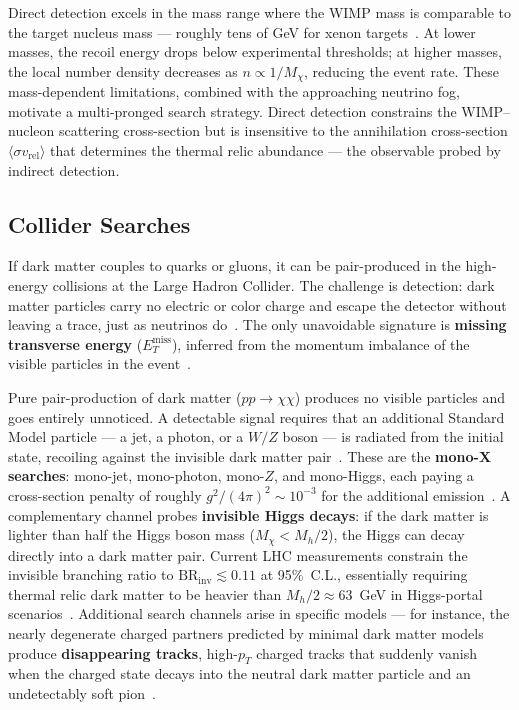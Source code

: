 Direct detection excels in the mass range where the WIMP mass is comparable to the target nucleus mass --- roughly tens of GeV for xenon targets~\cite{Cirelli:2024ssz}.
At lower masses, the recoil energy drops below experimental thresholds; at higher masses, the local number density decreases as $n \propto 1/M_\chi$, reducing the event rate.
These mass-dependent limitations, combined with the approaching neutrino fog, motivate a multi-pronged search strategy.
Direct detection constrains the WIMP--nucleon scattering cross-section but is insensitive to the annihilation cross-section $\langle \sigma v_\mathrm{rel} \rangle$ that determines the thermal relic abundance --- the observable probed by indirect detection.

\subsection{Collider Searches}
\label{sec:1.3.2}

If dark matter couples to quarks or gluons, it can be pair-produced in the high-energy collisions at the Large Hadron Collider.
The challenge is detection: dark matter particles carry no electric or color charge and escape the detector without leaving a trace, just as neutrinos do~\cite{Cirelli:2024ssz,Hooper:2024}.
The only unavoidable signature is \textbf{missing transverse energy} ($E_T^\text{miss}$), inferred from the momentum imbalance of the visible particles in the event~\cite{Cirelli:2024ssz}.

Pure pair-production of dark matter ($pp \to \chi\chi$) produces no visible particles and goes entirely unnoticed.
A detectable signal requires that an additional Standard Model particle --- a jet, a photon, or a $W/Z$ boson --- is radiated from the initial state, recoiling against the invisible dark matter pair~\cite{Cirelli:2024ssz}.
These are the \textbf{mono-X searches}: mono-jet, mono-photon, mono-$Z$, and mono-Higgs, each paying a cross-section penalty of roughly $g^2/(4\pi)^2 \sim 10^{-3}$ for the additional emission~\cite{Cirelli:2024ssz}.
A complementary channel probes \textbf{invisible Higgs decays}: if the dark matter is lighter than half the Higgs boson mass ($M_\chi < M_h/2$), the Higgs can decay directly into a dark matter pair.
Current LHC measurements constrain the invisible branching ratio to $\text{BR}_\text{inv} \lesssim 0.11$ at 95\%~C.L., essentially requiring thermal relic dark matter to be heavier than $M_h/2 \approx 63$~GeV in Higgs-portal scenarios~\cite{Cirelli:2024ssz}.
Additional search channels arise in specific models --- for instance, the nearly degenerate charged partners predicted by minimal dark matter models produce \textbf{disappearing tracks}, high-$p_T$ charged tracks that suddenly vanish when the charged state decays into the neutral dark matter particle and an undetectably soft pion~\cite{Cirelli:2024ssz}.


